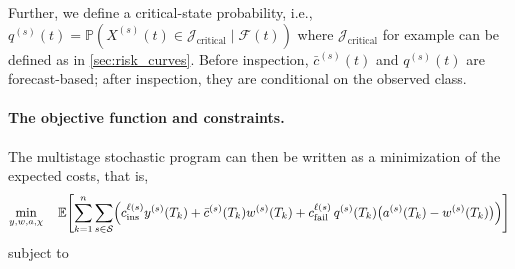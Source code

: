 \documentclass{article}
\providecommand{\DIFaddbegin}{} %
\providecommand{\DIFaddend}{} %
\providecommand{\DIFdelbegin}{} %
\providecommand{\DIFdelend}{} %
\begin{document}
Further, we define a critical-state probability, i.e., 
$
q^{(s)}(t) = \mathds P\left(X^{(s)}(t) \in \mathcal J_{\text{critical}} \mid \mathcal F(t) \right)
$ 
where $\mathcal J_{\text{critical}}$ for example can be defined as in \cref{sec:risk_curves}.
Before inspection, $\bar c^{(s)}(t)$ and $q^{(s)}(t)$ are forecast-based; after inspection, they are conditional on the observed class.

\paragraph{The objective function and constraints.}
The multistage stochastic program can then be written as a minimization of the expected costs, that is,
\DIFdelbegin %
\DIFdelend \DIFaddbegin \begin{align}
\min_{y,w,a,\chi}\quad
\mathbb E\!\left[
\sum_{k=1}^n\sum_{s\in\mathcal S}
\Bigl(
c_{\mathrm{ins}}^{\ell(s)} y^{(s)}(T_k)
+ \bar c^{(s)}(T_k) w^{(s)}(T_k)
+ c_{\mathrm{fail}}^{\ell(s)}\,q^{(s)}(T_k)\bigl(a^{(s)}(T_k)-w^{(s)}(T_k)\bigr)
\Bigr)
\right]
\label{eq:general_textbook_obj}
\end{align}\DIFaddend 
subject to
\DIFdelbegin %
\end{document}
